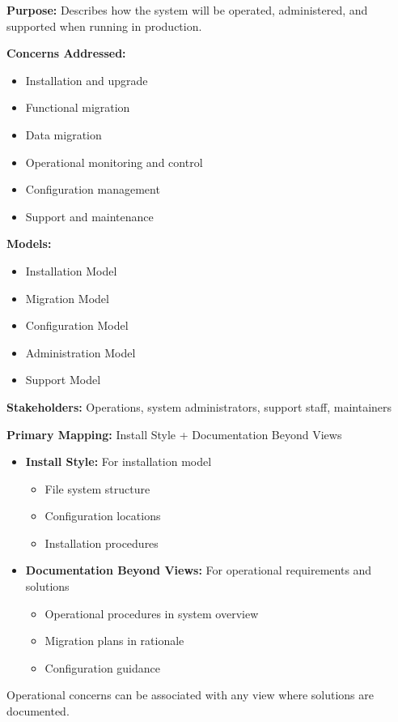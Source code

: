 \documentclass[11pt]{article}
\begin{document}
\begin{rwbox}
\textbf{Purpose:} Describes how the system will be operated, administered, and supported when running in production.

\textbf{Concerns Addressed:}
\begin{itemize}[nosep]
    \item Installation and upgrade
    \item Functional migration
    \item Data migration
    \item Operational monitoring and control
    \item Configuration management
    \item Support and maintenance
\end{itemize}

\textbf{Models:}
\begin{itemize}[nosep]
    \item Installation Model
    \item Migration Model
    \item Configuration Model
    \item Administration Model
    \item Support Model
\end{itemize}

\textbf{Stakeholders:} Operations, system administrators, support staff, maintainers
\end{rwbox}

\begin{vbbox}
\textbf{Primary Mapping:} Install Style + Documentation Beyond Views

\begin{itemize}
    \item \textbf{Install Style:} For installation model
    \begin{itemize}[nosep]
        \item File system structure
        \item Configuration locations
        \item Installation procedures
    \end{itemize}
    \item \textbf{Documentation Beyond Views:} For operational requirements and solutions
    \begin{itemize}[nosep]
        \item Operational procedures in system overview
        \item Migration plans in rationale
        \item Configuration guidance
    \end{itemize}
\end{itemize}

Operational concerns can be associated with any view where solutions are documented.
\end{vbbox}
\end{document}
